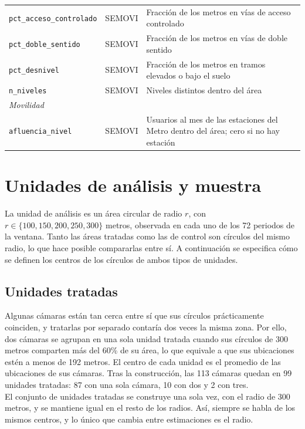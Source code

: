 \begin{table}[htbp]
\begin{tabularx}{\textwidth}{l l >{\raggedright\arraybackslash}X}
        \texttt{pct\_acceso\_controlado} & SEMOVI & Fracción de los metros en vías de acceso controlado \\
        \texttt{pct\_doble\_sentido} & SEMOVI & Fracción de los metros en vías de doble sentido \\
        \texttt{pct\_desnivel} & SEMOVI & Fracción de los metros en tramos elevados o bajo el suelo \\
        \texttt{n\_niveles} & SEMOVI & Niveles distintos dentro del área \\
        \midrule
        \multicolumn{3}{l}{\textit{Movilidad}} \\
        \texttt{afluencia\_nivel} & SEMOVI & Usuarios al mes de las estaciones del Metro dentro del área; cero si no hay estación \\
        \bottomrule
    \end{tabularx}
\end{table}

\section{Unidades de análisis y muestra}

\noindent La unidad de análisis es un área circular de radio $r$, con $r \in \{100, 150, 200, 250, 300\}$ metros, observada en cada uno de los 72 periodos de la ventana. Tanto las áreas tratadas como las de control son círculos del mismo radio, lo que hace posible compararlas entre sí. A continuación se especifica cómo se definen los centros de los círculos de ambos tipos de unidades.

\subsection{Unidades tratadas}
\label{sec:unidades}

\noindent Algunas cámaras están tan cerca entre sí que sus círculos prácticamente coinciden, y tratarlas por separado contaría dos veces la misma zona. Por ello, dos cámaras se agrupan en una sola unidad tratada cuando sus círculos de 300 metros comparten más del 60\% de su área, lo que equivale a que sus ubicaciones estén a menos de 192 metros. El centro de cada unidad es el promedio de las ubicaciones de sus cámaras. Tras la construcción, las 113 cámaras quedan en 99 unidades tratadas: 87 con una sola cámara, 10 con dos y 2 con tres.\\

El conjunto de unidades tratadas se construye una sola vez, con el radio de 300 metros, y se mantiene igual en el resto de los radios. Así, siempre se habla de los mismos centros, y lo único que cambia entre estimaciones es el radio.\\

